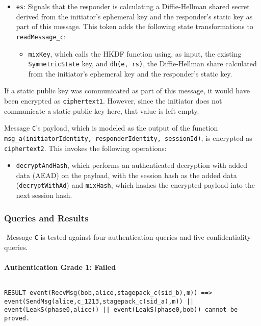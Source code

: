 \begin{itemize}

\item \texttt{es}: Signals that the responder is calculating a Diffie-Hellman shared secret derived from the initiator's ephemeral key and the responder's static key as part of this message. This token adds the following state transformations to \texttt{readMessage\_c}:
\begin{itemize}

\item \texttt{mixKey}, which calls the HKDF function using, as input, the existing \texttt{SymmetricState} key, and \texttt{dh(e, rs)}, the Diffie-Hellman share calculated from the initiator's ephemeral key and the responder's static key.
\end{itemize}


\end{itemize}
If a static public key was communicated as part of this message, it would have been encrypted as \texttt{ciphertext1}. However, since the initiator does not communicate a static public key here, that value is left empty.


Message \texttt{C}'s payload, which is modeled as the output of the function \texttt{msg\_a(initiatorIdentity, responderIdentity, sessionId)}, is encrypted as \texttt{ciphertext2}. This invokes the following operations:


\begin{itemize}

\item \texttt{decryptAndHash}, which performs an authenticated decryption with added data (AEAD) on the payload, with the session hash as the added data (\texttt{decryptWithAd}) and \texttt{mixHash}, which hashes the encrypted payload into the next session hash.

\end{itemize}
\subsubsection{Queries and Results}$ $
Message \texttt{C} is tested against four authentication queries and five confidentiality queries.
\paragraph{Authentication Grade 1: Failed}$ $
\begin{lstlisting}
RESULT event(RecvMsg(bob,alice,stagepack_c(sid_b),m)) ==> event(SendMsg(alice,c_1213,stagepack_c(sid_a),m)) || event(LeakS(phase0,alice)) || event(LeakS(phase0,bob)) cannot be proved.
\end{lstlisting}

